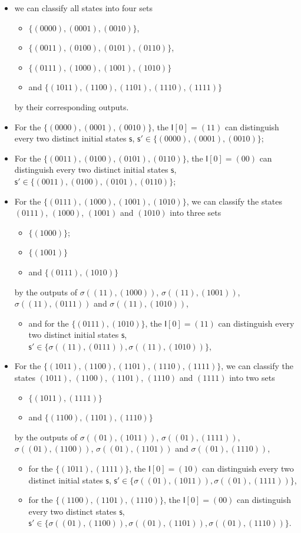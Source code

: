 \begin{itemize}
  \item we can classify all states into four sets 
  \begin{itemize}
   \item $\{(0000),(0001),(0010)\}$,
   \item $\{(0011),(0100),(0101),(0110)\}$,
   \item $\{(0111),(1000),(1001),(1010)\}$
   \item and $\{(1011),(1100),(1101),(1110),(1111)\}$
  \end{itemize} 
    by their corresponding outputs.  
  \item For the $\{(0000),(0001),(0010)\}$, the $\mathsf{I}[0]=(11)$ can distinguish every two distinct initial states $\mathsf{s}$, $\mathsf{s}'\in \{(0000),(0001),(0010)\}$;
  \item For the $\{(0011),(0100),(0101),(0110)\}$, the $\mathsf{I}[0]=(00)$ can distinguish every two distinct initial states $\mathsf{s}$, $\mathsf{s}'\in \{(0011),(0100),(0101),(0110)\}$;
  \item For the $\{(0111),(1000),(1001),(1010)\}$, we can classify the states $(0111)$, $(1000)$, $(1001)$ and $(1010)$ into three sets 
   \begin{itemize}
   \item $\{(1000)\}$;
   \item  $\{(1001)\}$
   \item and $\{(0111),(1010)\}$
   \end{itemize} 
  by the outputs of $\sigma ((11), (1000))$, $\sigma ((11), (1001))$, $\sigma ((11), (0111))$ and $\sigma ((11), (1010))$,
  \begin{itemize}
  \item  and for the $\{(0111),(1010)\}$, the $\mathsf{I}[0]=(11)$ can distinguish every two distinct initial states $\mathsf{s}$, $\mathsf{s}'\in \{\sigma ((11), (0111)),\sigma ((11), (1010))\}$,
  \end{itemize}
  \item For the $\{(1011),(1100),(1101),(1110),(1111)\}$, we can classify the states $(1011)$, $(1100)$, $(1101)$, $(1110)$ and $(1111)$  into two sets 
    \begin{itemize}
   \item  $\{(1011),(1111)\}$
   \item and $\{(1100),(1101),(1110)\}$
  \end{itemize}
    by the outputs of $\sigma ((01), (1011))$, $\sigma ((01), (1111))$, $\sigma ((01), (1100))$, $\sigma ((01), (1101))$ and $\sigma ((01), (1110))$,
  \begin{itemize}
   \item for the $\{(1011),(1111)\}$, the $\mathsf{I}[0]=(10)$ can distinguish every two distinct initial states $\mathsf{s}$, $\mathsf{s}'\in \{\sigma ((01), (1011)),\sigma ((01), (1111))\}$,
  \item  for the $\{(1100),(1101),(1110)\}$, the $\mathsf{I}[0]=(00)$ can distinguish every two distinct states $\mathsf{s}$, $\mathsf{s}'\in \{\sigma ((01), (1100)),\sigma ((01), (1101)), \sigma ((01), (1110))\}$.
  \end{itemize}
\end{itemize} 
